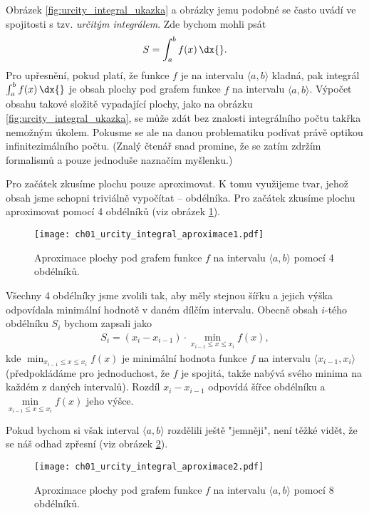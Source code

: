 Obrázek \ref{fig:urcity_integral_ukazka} a obrázky jemu podobné se často uvádí ve spojitosti s tzv. \emph{určitým integrálem}. Zde bychom mohli psát
\begin{align*}
S=\int_{a}^{b}{f(x)\,\dx{}}.
\end{align*}
Pro upřesnění, pokud platí, že funkce $f$ je na intervalu $\langle a,b \rangle$ kladná, pak integrál $\int_a^b{f(x)\,\dx{}}$ je obsah plochy pod grafem funkce $f$ na intervalu $\langle a,b \rangle$. Výpočet obsahu takové složitě vypadající plochy, jako na obrázku \ref{fig:urcity_integral_ukazka}, se může zdát bez znalosti integrálního počtu takřka nemožným úkolem. Pokusme se ale na danou problematiku podívat právě optikou infinitezimálního počtu. (Znalý čtenář snad promine, že se zatím zdržím formalismů a pouze jednoduše naznačím myšlenku.)\par
Pro začátek zkusíme plochu pouze aproximovat. K tomu využijeme tvar, jehož obsah jsme schopni triviálně vypočítat -- obdélníka. Pro začátek zkusíme plochu aproximovat pomocí 4 obdélníků (viz obrázek \ref{fig:urcity_integral_aproximace1}).
\begin{figure}[H]
	\centering
	\texttt{[image: ch01\_urcity\_integral\_aproximace1.pdf]}
	\caption{Aproximace plochy pod grafem funkce $f$ na intervalu $\langle a,b \rangle$ pomocí 4 obdélníků.}
	\label{fig:urcity_integral_aproximace1}
\end{figure}
Všechny 4 obdélníky jsme zvolili tak, aby měly stejnou šířku a jejich výška odpovídala minimální hodnotě v daném dílčím intervalu. Obecně obsah $i$-tého obdélníku $S_i$ bychom zapsali jako
\begin{align*}
S_i= (x_i-x_{i-1}) \cdot \min\limits_{x_{i-1} \leq x \leq x_i}{f(x)},
\end{align*}
kde $\min_{x_{i-1} \leq x \leq x_i}{f(x)}$ je minimální hodnota funkce $f$ na intervalu $\langle x_{i-1},x_i \rangle$ (předpokládáme pro jednoduchost, že $f$ je spojitá, takže nabývá svého minima na každém z daných intervalů). Rozdíl $x_i-x_{i-1}$ odpovídá šířce obdélníku a $\min\limits_{x_{i-1} \leq x \leq x_i}{f(x)}$ jeho výšce.\par
Pokud bychom si však interval $\langle a,b \rangle$ rozdělili ještě "jemněji", není těžké vidět, že se náš odhad zpřesní (viz obrázek \ref{fig:urcity_integral_aproximace2}).
\begin{figure}[H]
	\centering	\texttt{[image: ch01\_urcity\_integral\_aproximace2.pdf]}
	\caption{Aproximace plochy pod grafem funkce $f$ na intervalu $\langle a,b \rangle$ pomocí 8 obdélníků.}
	\label{fig:urcity_integral_aproximace2}
\end{figure}
